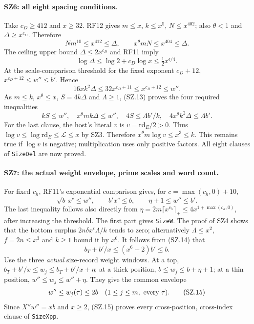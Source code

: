 \documentclass[11pt,a4paper]{article}
\numberwithin{equation}{section}
\theoremstyle{remark}\newtheorem{remark}[theorem]{Remark}
\begin{document}
\paragraph{SZ6: all eight spacing conditions.}
Take $c_D\geq412$ and $x\geq32$. RF12 gives
$m\leq x$, $k\leq x^5$, $N\leq x^{402}$; also
$\theta<1$ and $\Delta\geq x^{c_D}$. Therefore
\[
 Nm^{10}\leq x^{412}\leq\Delta,\qquad
 x^\theta mN\leq x^{404}\leq\Delta.
\]
The ceiling upper bound $\Delta\leq2x^{c_D}$ and RF11 imply
\[
        \log\Delta\leq\log2+c_D\log x
                                   \leq\tfrac12x^{\epsilon/4}.
                                                                    \tag{SZ.12}
\]
At the scale-comparison threshold for the fixed exponent $c_D+12$,
$x^{c_D+12}\leq w''\leq b'$. Hence
\[
             16xk^2\Delta
                    \leq32x^{c_D+11}\leq x^{c_D+12}\leq w''.
                                                                    \tag{SZ.13}
\]
As $m\leq k$, $x^\theta\leq x$, $S=4k\Delta$ and
$\Lambda\geq1$, (SZ.13) proves the four required inequalities
\[
 kS\leq w'',\quad x^\theta mk\Delta\leq w'',\quad
          4S\leq\Lambda b'/k,\quad
          4x^\theta k^2\Delta\leq\Lambda b'.
\]
For the last clause, the host's literal $v$ is
$v=\mathrm{rd}_E/2>0$. Thus $\log v\leq\log\mathrm{rd}_E
\leq\mathcal L\leq x$ by SZ3. Therefore
$x^\theta m\log v\leq x^3\leq k$. This remains true if
$\log v$ is negative; multiplication uses only positive factors.
All eight clauses of \texttt{SizeDel} are now proved.

\paragraph{SZ7: the actual weight envelope, prime scales and word count.}
For fixed $c_h$, RF11's exponential comparison gives, for
$c=\max(c_h,0)+10$,
\[
 \sqrt b\,x^c\leq w'',\qquad b'x^c\leq b,
       \qquad\eta+1\leq w''\leq b'.                           \tag{SZ.14}
\]
The last inequality follows also directly from
$\eta=2m\lceil x^{c_h}\rceil_+\leq4x^{1+\max(c_h,0)}$,
after increasing the threshold. The first part gives
\texttt{SizeW}. The proof of SZ4 shows that the bottom surplus
$2n\delta x^\epsilon\Lambda/k$ tends to zero; alternatively
$\Lambda\leq x^2$, $f=2n\leq x^3$ and $k\geq1$ bound it by
$x^6$. It follows from (SZ.14) that
\[
          b_T+b'/x\leq(x^6+2)b'\leq b.
\]
Use the three \emph{actual} size-record weight windows. At a top,
$b_T+b'/x\leq w_j\leq b_T+b'/x+\eta$; at a thick position,
$b\leq w_j\leq b+\eta+1$; at a thin position,
$w''\leq w_j\leq w''+\eta$. They give the common envelope
\[
               w''\leq w_j(\tau)\leq2b
             \quad(1\leq j\leq m,\ \hbox{every }\tau).       \tag{SZ.15}
\]
Since $X''w''=xb$ and $x\geq2$, (SZ.15) proves every
cross-position, cross-index clause of \texttt{SizeXpp}.
\end{document}
